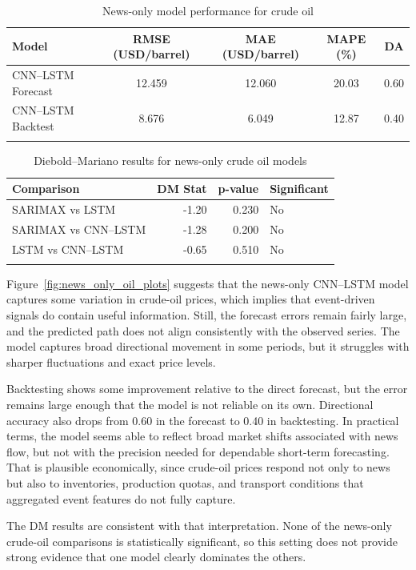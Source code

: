\documentclass[pdflatex,sn-mathphys-num]{sn-jnl}%
\theoremstyle{thmstyleone}%
\theoremstyle{thmstyletwo}%
\theoremstyle{thmstylethree}%
\begin{document}
\begin{table}[h]
\centering
\caption{News-only model performance for crude oil}
\label{tab:news_only_oil}
\begin{tabular}{@{}lcccc@{}}
\toprule
Model & RMSE (USD/barrel) & MAE (USD/barrel) & MAPE (\%) & DA \\
\midrule
CNN--LSTM Forecast & 12.459 & 12.060 & 20.03 & 0.60 \\
CNN--LSTM Backtest & 8.676 & 6.049 & 12.87 & 0.40 \\
\botrule
\end{tabular}
\end{table}

\begin{table}[h]
\centering
\small
\caption{Diebold--Mariano results for news-only crude oil models}
\label{tab:dm_news_oil}
\begin{tabular}{@{}lrrl@{}}
\toprule
Comparison & DM Stat & p-value & Significant \\
\midrule
SARIMAX vs LSTM & -1.20 & 0.230 & No \\
SARIMAX vs CNN--LSTM & -1.28 & 0.200 & No \\
LSTM vs CNN--LSTM & -0.65 & 0.510 & No \\
\botrule
\end{tabular}
\end{table}

Figure~\ref{fig:news_only_oil_plots} suggests that the news-only CNN--LSTM model captures some variation in crude-oil prices, which implies that event-driven signals do contain useful information. Still, the forecast errors remain fairly large, and the predicted path does not align consistently with the observed series. The model captures broad directional movement in some periods, but it struggles with sharper fluctuations and exact price levels.

Backtesting shows some improvement relative to the direct forecast, but the error remains large enough that the model is not reliable on its own. Directional accuracy also drops from 0.60 in the forecast to 0.40 in backtesting. In practical terms, the model seems able to reflect broad market shifts associated with news flow, but not with the precision needed for dependable short-term forecasting. That is plausible economically, since crude-oil prices respond not only to news but also to inventories, production quotas, and transport conditions that aggregated event features do not fully capture.

The DM results are consistent with that interpretation. None of the news-only crude-oil comparisons is statistically significant, so this setting does not provide strong evidence that one model clearly dominates the others.
\end{document}
